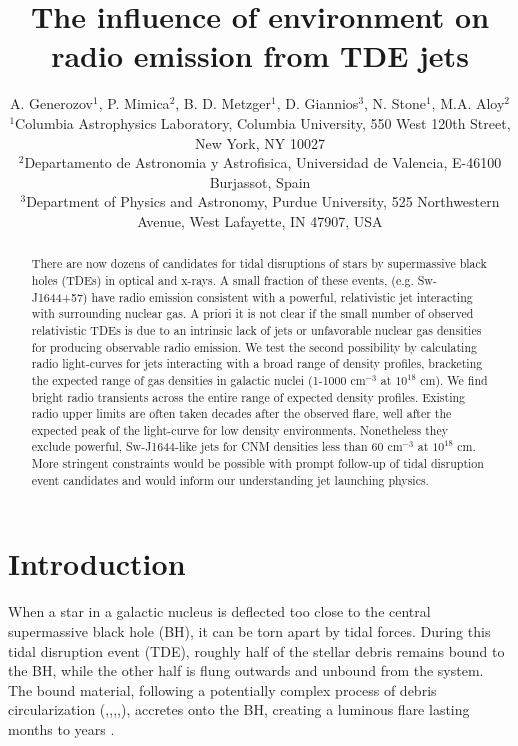 \documentclass[usenatbib,fleqn]{mnras}
\title{The influence of environment on radio emission from TDE jets}
\author[Generozov et al.]{ A. Generozov$^{1}$, P. Mimica$^{2}$,
  B. D. Metzger$^{1}$,
  D. Giannios$^{3}$, 
  N. Stone$^{1}$,
  M.A. Aloy$^{2}$ 
  \\
  $^{1}$Columbia Astrophysics Laboratory, Columbia University, 550 West 120th Street, New York, NY 10027\\
  $^{2}$Departamento de Astronomia y Astrofisica, Universidad de Valencia, E-46100 Burjassot, Spain\\
  $^{3}$Department of Physics and Astronomy, Purdue University, 525
  Northwestern Avenue, West Lafayette, IN 47907, USA}
\begin{document}
\maketitle
\begin{abstract}
  There are now dozens of candidates for tidal disruptions of stars by
  supermassive black holes (TDEs) in optical and x-rays. A small
  fraction of these events, (e.g. Sw-J1644+57) have radio emission
  consistent with a powerful, relativistic jet interacting with
  surrounding nuclear gas. A priori it is not clear if the small
  number of observed relativistic TDEs is due to an intrinsic lack of jets
  or unfavorable nuclear gas densities for producing observable radio
  emission. We test the second possibility by calculating radio
  light-curves for jets interacting with a broad range of density
  profiles, bracketing the expected range of gas densities in galactic
  nuclei (1-1000 cm$^{-3}$ at $10^{18}$ cm). We find bright radio
  transients across the entire range of expected density
  profiles. Existing radio upper limits are often taken decades after
  the observed flare, well after the expected peak of the light-curve
  for low density environments. Nonetheless they exclude powerful,
  Sw-J1644-like jets for CNM densities less than 60 cm$^{-3}$ at
  $10^{18}$ cm. More stringent constraints would be possible with
  prompt follow-up of tidal disruption event candidates and would
  inform our understanding jet launching physics.
\end{abstract}
\section{Introduction}
\label{sec:intro}
When a star in a galactic nucleus is deflected too close to the
central supermassive black hole (BH), it can be torn apart by tidal
forces.  During this tidal disruption event (TDE), roughly half of the
stellar debris remains bound to the BH, while the other half is flung
outwards and unbound from the system.  The bound material, following a
potentially complex process of debris circularization
(\citealt{Guillochon+2013},\citealt{Hayasaki+2013},\citealt{Hayasaki+2015},\citealt{Shiokawa+2015},\citealt{Bonnerot+2015}),
accretes onto the BH, creating a luminous flare lasting months to
years \citep{Hills1975, Carter+1982, Rees1988}.
\end{document}
